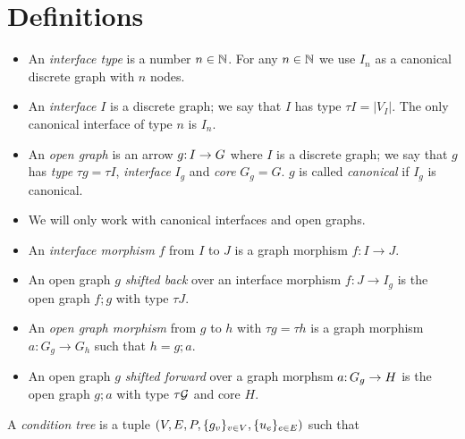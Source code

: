 \section{Definitions}
\label{sec:definitions}

\begin{itemize}
\item An \emph{interface type} is a number $n\in\mathbb{N}$. For any $n\in \mathbb{N}$ we use $I_n$ as a canonical discrete graph with $n$ nodes. 

\item An \emph{interface} $I$ is a discrete graph; we say that $I$ has type $\tau I=|V_I|$. The only canonical interface of type $n$ is $I_n$.

\item An \emph{open graph} is an arrow $g{:}\, I\rightarrow G$ where $I$ is a discrete graph; we say that $g$ has \emph{type} $\tau g=\tau I$, \emph{interface} $I_g$ and \emph{core} $G_g=G$. $g$ is called \emph{canonical} if $I_g$ is canonical.

\item We will only work with canonical interfaces and open graphs. 

\item An \emph{interface morphism} $f$ from $I$ to $J$ is a graph morphism $f:I\to J$.

\item An open graph $g$ \emph{shifted back} over an interface morphism $f:J\to I_g$ is the open graph $f;g$ with type $\tau J$.

\item An \emph{open graph morphism} from $g$ to $h$ with $\tau g=\tau h$ is a graph morphism $a:G_g\to G_h$ such that $h=g;a$.

\item An open graph $g$ \emph{shifted forward} over a graph morphsm $a{:}\, G_g\rightarrow H$ is the open graph $g;a$ with type $\tau{\mathcal{G}}$ and core $H$.
\end{itemize}
%
A \emph{condition tree} is a tuple $(V,E,P,\{{g_v}\}_{v\in V},\{{u_e}\}_{e\in E})$ such that

